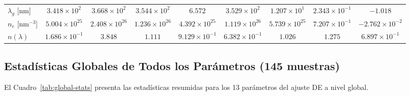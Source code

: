 \documentclass{article}
\begin{document}
\begin{table}[htbp]
\begin{tabular}{@{}lcccccccc@{}}
$\lambda_{g}$ [nm] & $3.418 \times 10^2$ & $3.668 \times 10^2$ & $3.544 \times 10^2$ & $6.572$ & $3.529 \times 10^2$ & $1.207 \times 10^1$ & $2.343 \times 10^{-1}$ & $-1.018$ \\
$n_{e}$ [nm$^{-3}$] & $5.004 \times 10^{25}$ & $2.408 \times 10^{26}$ & $1.236 \times 10^{26}$ & $4.392 \times 10^{25}$ & $1.119 \times 10^{26}$ & $5.739 \times 10^{25}$ & $7.207 \times 10^{-1}$ & $-2.762 \times 10^{-2}$ \\
$n(\lambda)$ & $1.686 \times 10^{-1}$ & $3.848$ & $1.111$ & $9.129 \times 10^{-1}$ & $6.382 \times 10^{-1}$ & $1.026$ & $1.275$ & $6.897 \times 10^{-1}$ \\
\bottomrule
\end{tabular}
\end{table}

\subsection{Estad\'isticas Globales de Todos los Par\'ametros (145 muestras)}

El Cuadro~\ref{tab:global-stats} presenta las estad\'isticas resumidas para los 13 par\'ametros del ajuste DE a nivel global.
\end{document}
